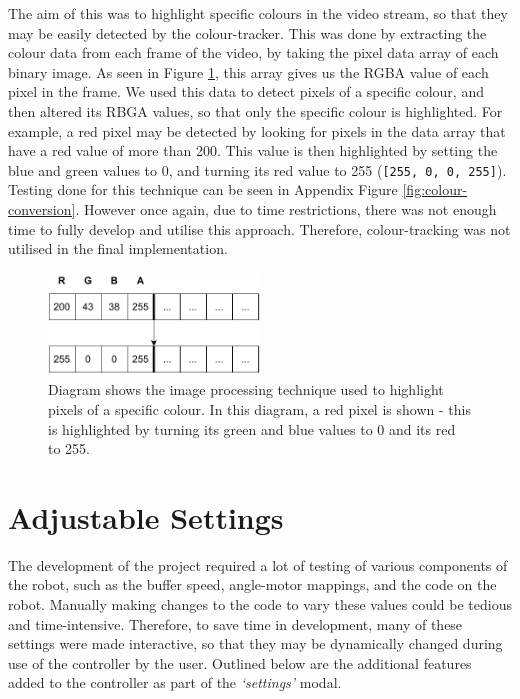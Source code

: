 \documentclass{l4proj}
\begin{document}
The aim of this was to highlight specific colours in the video stream, so that they may be easily detected by the colour-tracker. This was done by extracting the colour data from each frame of the video, by taking the pixel data array of each binary image. As seen in Figure \ref{fig:image-processing}, this array gives us the RGBA value of each pixel in the frame. We used this data to detect pixels of a specific colour, and then altered its RBGA values, so that only the specific colour is highlighted. For example, a red pixel may be detected by looking for pixels in the data array that have a red value of more than 200. This value is then highlighted by setting the blue and green values to 0, and turning its red value to 255 (\lstinline{[255, 0, 0, 255]}). Testing done for this technique can be seen in Appendix Figure \ref{fig:colour-conversion}. However once again, due to time restrictions, there was not enough time to fully develop and utilise this approach. Therefore, colour-tracking was not utilised in the final implementation.

\begin{figure}
    \centering
    \includegraphics[width=0.5\textwidth]{images/image-processing.pdf}
    \caption{Diagram shows the image processing technique used to highlight pixels of a specific colour. In this diagram, a red pixel is shown - this is highlighted by turning its green and blue values to 0 and its red to 255.}
    \label{fig:image-processing}
\end{figure}


\section{Adjustable Settings}
The development of the project required a lot of testing of various components of the robot, such as the buffer speed, angle-motor mappings, and the code on the robot. Manually making changes to the code to vary these values could be tedious and time-intensive. Therefore, to save time in development, many of these settings were made interactive, so that they may be dynamically changed during use of the controller by the user. Outlined below are the additional features added to the controller as part of the \textit{‘settings’} modal.
\end{document}
